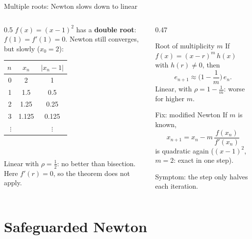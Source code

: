 \documentclass[aspectratio=169]{beamer}
\begin{document}
\begin{frame}{Multiple roots: Newton slows down to linear}
\begin{columns}[T]
\begin{column}{0.5\textwidth}
\small
$f(x) = (x-1)^2$ has a \textbf{double root}: $f(1) = f'(1) = 0$. Newton still converges, but slowly ($x_0 = 2$):

\vspace{0.1cm}
\centering
\footnotesize
\begin{tabular}{rcc}
\toprule
$n$ & $x_n$ & $|x_n - 1|$ \\
\midrule
0 & 2 & 1 \\
1 & 1.5 & 0.5 \\
2 & 1.25 & 0.25 \\
3 & 1.125 & 0.125 \\
$\vdots$ & & $\vdots$ \\
\bottomrule
\end{tabular}\\[3pt]
\raggedright
\scriptsize Linear with $\rho = \tfrac12$: no better than bisection. Here $f'(r) = 0$, so the theorem does not apply.
\end{column}
\begin{column}{0.47\textwidth}
\begin{block}{Root of multiplicity $m$}
\footnotesize If $f(x) = (x - r)^m\,h(x)$ with $h(r) \neq 0$, then
\[
e_{n+1} \approx \Big(1 - \frac1m\Big)\,e_n .
\]
Linear, with $\rho = 1 - \tfrac1m$: worse for higher $m$.
\end{block}
\begin{exampleblock}{Fix: modified Newton}
\footnotesize If $m$ is known,
\[
x_{n+1} = x_n - m\,\frac{f(x_n)}{f'(x_n)}
\]
is quadratic again ($(x-1)^2$, $m = 2$: exact in one step).
\end{exampleblock}
\scriptsize Symptom: the step only halves each iteration.
\end{column}
\end{columns}
\end{frame}

\section{Safeguarded Newton}
\end{document}
